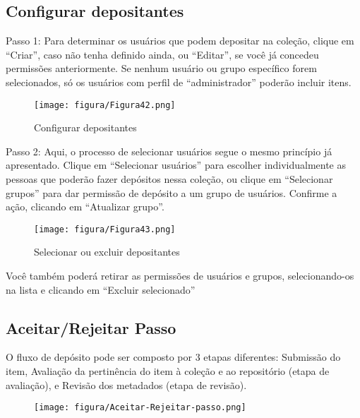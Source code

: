 \documentclass[12pt,hidelinks]{article}
\begin{document}
    \subsection{Configurar depositantes}
    
    Passo 1: Para determinar os usuários que podem depositar na coleção, clique em “Criar”, caso não tenha definido ainda, ou “Editar”, se você já concedeu permissões anteriormente. Se nenhum usuário ou grupo específico forem selecionados, só os usuários com perfil de “administrador” poderão incluir itens.
    
    \begin{figure}[!htp]
                \centering
                \texttt{[image: figura/Figura42.png]}
                \caption{Configurar depositantes}
            \label{Rotulo}
        \end{figure}

    \singlespacing
    
    Passo 2: Aqui, o processo de selecionar usuários segue o mesmo princípio já apresentado. Clique em “Selecionar usuários” para escolher individualmente as pessoas que poderão fazer depósitos nessa coleção, ou clique em “Selecionar grupos” para dar permissão de depósito a um grupo de usuários. Confirme a ação, clicando em “Atualizar grupo”.
    
    \begin{figure}[!htp]
                \centering
                \texttt{[image: figura/Figura43.png]}
                \caption{Selecionar ou excluir depositantes}
            \label{Rotulo}
        \end{figure}

\newpage

    Você também poderá retirar as permissões de usuários e grupos, selecionando-os na lista e clicando em “Excluir selecionado”
    
    \subsection{Aceitar/Rejeitar Passo}
    
    O fluxo de depósito pode ser composto por 3 etapas diferentes: Submissão do item, Avaliação da pertinência do item à coleção e ao repositório (etapa de avaliação), e Revisão dos metadados (etapa de revisão).
    
    \begin{figure}[!htp]
                \centering
                \texttt{[image: figura/Aceitar-Rejeitar-passo.png]}
            \label{Rotulo}
        \end{figure}
    
\end{document}
